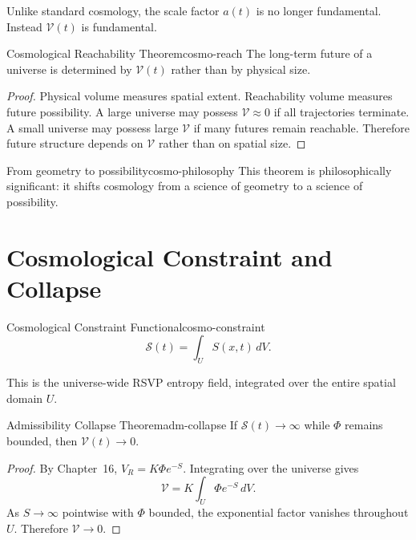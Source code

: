 \documentclass[12pt,twoside,openright]{book}
\begin{document}
Unlike standard cosmology, the scale factor $a(t)$ is no
longer fundamental. Instead $\mathcal{V}(t)$ is fundamental.

\begin{theorem}{Cosmological Reachability Theorem}{cosmo-reach}
  The long-term future of a universe is determined by
  $\mathcal{V}(t)$ rather than by physical size.
\end{theorem}

\begin{proof}
  Physical volume measures spatial extent. Reachability
  volume measures future possibility. A large universe may
  possess $\mathcal{V} \approx 0$ if all trajectories
  terminate. A small universe may possess large
  $\mathcal{V}$ if many futures remain reachable. Therefore
  future structure depends on $\mathcal{V}$ rather than on
  spatial size.
\end{proof}

\begin{remark}{From geometry to possibility}{cosmo-philosophy}
  This theorem is philosophically significant: it shifts
  cosmology from a science of geometry to a science of
  possibility.
\end{remark}

\section{Cosmological Constraint and Collapse}
\label{sec:ch18-collapse}

\begin{definition}{Cosmological Constraint Functional}{cosmo-constraint}
  \[
    \mathcal{S}(t) = \int_U S(x,t)\, dV.
  \]
\end{definition}

This is the universe-wide RSVP entropy field, integrated
over the entire spatial domain $U$.

\begin{theorem}{Admissibility Collapse Theorem}{adm-collapse}
  If $\mathcal{S}(t) \to \infty$ while $\Phi$ remains
  bounded, then $\mathcal{V}(t) \to 0$.
\end{theorem}

\begin{proof}
  By Chapter~16, $V_R = K\Phi e^{-S}$. Integrating over the
  universe gives
  \[
    \mathcal{V} = K \int_U \Phi e^{-S} \, dV.
  \]
  As $S \to \infty$ pointwise with $\Phi$ bounded, the
  exponential factor vanishes throughout $U$. Therefore
  $\mathcal{V} \to 0$.
\end{proof}
\end{document}
